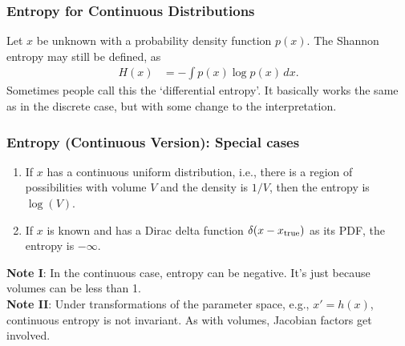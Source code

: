 \documentclass{beamer}
\begin{document}
\begin{frame}
\frametitle{Entropy for Continuous Distributions}
Let $x$ be unknown with a probability density function $p(x)$.
The Shannon entropy may still be defined, as
\begin{align}
H(x) &= -\int p(x) \log p(x) \, dx.
\end{align}
\pause
Sometimes people call this the `differential entropy'.
It basically works the same as in the discrete case,
but with some change to the interpretation.
\end{frame}

\begin{frame}
\frametitle{Entropy (Continuous Version): Special cases}
\begin{enumerate}
\item[(i)] If $x$ has a continuous uniform distribution,
i.e., there is a region of possibilities with volume $V$
and the density is $1/V$,
then the entropy is $\log(V)$.
\item[(ii)] If $x$ is known and has a Dirac delta function
$\delta(x - x_{\rm true})$ as its PDF,
the entropy is $-\infty$.
\end{enumerate}
\pause

{\bf Note I}: In the continuous case, entropy can be negative.
It's just because volumes can be less than 1.\\
{\bf Note II}: Under transformations of the parameter space,
e.g., $x' = h(x)$, continuous entropy is not invariant.
As with volumes, Jacobian factors get involved.
\end{frame}
\end{document}

